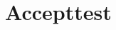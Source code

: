 \documentclass[Rapport/Rapport_main.tex]{subfiles}
\begin{document}
\section{Accepttest}
\end{document}
